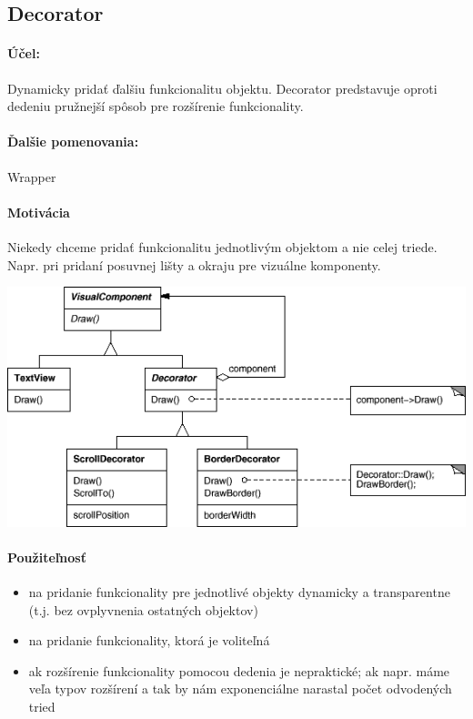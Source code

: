 	\subsection{Decorator}
		
		\paragraph{Účel: }
			Dynamicky pridať ďalšiu funkcionalitu objektu. Decorator predstavuje oproti dedeniu pružnejší spôsob pre rozšírenie funkcionality.

		\paragraph{Ďalšie pomenovania: }
				Wrapper

		\paragraph{Motivácia}
			Niekedy chceme pridať funkcionalitu jednotlivým objektom a nie celej triede. Napr. pri pridaní posuvnej lišty a okraju pre vizuálne komponenty.

			\includegraphics[width=.9\textwidth]{images/decorator1}

		\paragraph{Použiteľnosť}
			\begin{itemize}
				\item na pridanie funkcionality pre jednotlivé objekty dynamicky a transparentne (t.j. bez ovplyvnenia ostatných objektov)
				\item na pridanie funkcionality, ktorá je voliteľná
				\item ak rozšírenie funkcionality pomocou dedenia je nepraktické; ak napr. máme veľa typov rozšírení a tak by nám exponenciálne narastal počet odvodených tried
			\end{itemize}
